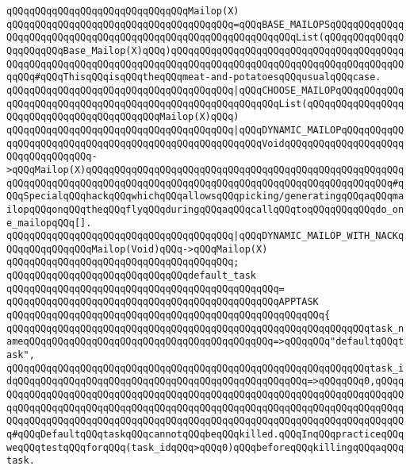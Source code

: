 \verb|qQQqqQQqqQQqqQQqqQQqqQQqqQQqqQQqMailop(X)|\newline
\verb|qQQqqQQqqQQqqQQqqQQqqQQqqQQqqQQqqQQqqQQq=qQQqBASE_MAILOPSqQQqqQQqqQQqqQQqqQQqqQQqqQQqqQQqqQQqqQQqqQQqqQQqqQQqqQQqqQQqqQQqList(qQQqqQQqqQQqqQQqqQQqqQQqBase_Mailop(X)qQQq)qQQqqQQqqQQqqQQqqQQqqQQqqQQqqQQqqQQqqQQqqQQqqQQqqQQqqQQqqQQqqQQqqQQqqQQqqQQqqQQqqQQqqQQqqQQqqQQqqQQqqQQqqQQqqQQqqQQq#qQQqThisqQQqisqQQqtheqQQqmeat-and-potatoesqQQqusualqQQqcase.|\newline
\verb|qQQqqQQqqQQqqQQqqQQqqQQqqQQqqQQqqQQqqQQq|\verb#|qQQqCHOOSE_MAILOPqQQqqQQqqQQqqQQqqQQqqQQqqQQqqQQqqQQqqQQqqQQqqQQqqQQqqQQqqQQqList(qQQqqQQqqQQqqQQqqQQqqQQqqQQqqQQqqQQqqQQqqQQqMailop(X)qQQq)#\newline
\verb|qQQqqQQqqQQqqQQqqQQqqQQqqQQqqQQqqQQqqQQq|\verb#|qQQqDYNAMIC_MAILOPqQQqqQQqqQQqqQQqqQQqqQQqqQQqqQQqqQQqqQQqqQQqqQQqqQQqqQQqVoidqQQqqQQqqQQqqQQqqQQqqQQqqQQqqQQqqQQq->qQQqMailop(X)qQQqqQQqqQQqqQQqqQQqqQQqqQQqqQQqqQQqqQQqqQQqqQQqqQQqqQQqqQQqqQQqqQQqqQQqqQQqqQQqqQQqqQQqqQQqqQQqqQQqqQQqqQQqqQQqqQQqqQQqqQQq#\verb|#qQQqSpecialqQQqhackqQQqwhichqQQqallowsqQQqpicking/generatingqQQqaqQQqmailopqQQqonqQQqtheqQQqflyqQQqduringqQQqaqQQqcallqQQqtoqQQqqQQqqQQqdo_one_mailopqQQq[].|\newline
\verb|qQQqqQQqqQQqqQQqqQQqqQQqqQQqqQQqqQQqqQQq|\verb#|qQQqDYNAMIC_MAILOP_WITH_NACKqQQqqQQqqQQqqQQqMailop(Void)qQQq->qQQqMailop(X)#\newline
\verb|qQQqqQQqqQQqqQQqqQQqqQQqqQQqqQQqqQQqqQQq;|\newline
\newline
\verb|qQQqqQQqqQQqqQQqqQQqqQQqqQQqqQQqdefault_task|\newline
\verb|qQQqqQQqqQQqqQQqqQQqqQQqqQQqqQQqqQQqqQQqqQQqqQQq=|\newline
\verb|qQQqqQQqqQQqqQQqqQQqqQQqqQQqqQQqqQQqqQQqqQQqqQQqAPPTASK|\newline
\verb|qQQqqQQqqQQqqQQqqQQqqQQqqQQqqQQqqQQqqQQqqQQqqQQqqQQqqQQq{|\newline
\verb|qQQqqQQqqQQqqQQqqQQqqQQqqQQqqQQqqQQqqQQqqQQqqQQqqQQqqQQqqQQqqQQqtask_nameqQQqqQQqqQQqqQQqqQQqqQQqqQQqqQQqqQQqqQQqqQQq=>qQQqqQQq"defaultqQQqtask",|\newline
\verb|qQQqqQQqqQQqqQQqqQQqqQQqqQQqqQQqqQQqqQQqqQQqqQQqqQQqqQQqqQQqqQQqtask_idqQQqqQQqqQQqqQQqqQQqqQQqqQQqqQQqqQQqqQQqqQQqqQQqqQQq=>qQQqqQQq0,qQQqqQQqqQQqqQQqqQQqqQQqqQQqqQQqqQQqqQQqqQQqqQQqqQQqqQQqqQQqqQQqqQQqqQQqqQQqqQQqqQQqqQQqqQQqqQQqqQQqqQQqqQQqqQQqqQQqqQQqqQQqqQQqqQQqqQQqqQQqqQQqqQQqqQQqqQQqqQQqqQQqqQQqqQQqqQQqqQQqqQQqqQQqqQQqqQQqqQQqqQQqqQQqqQQqqQQq#qQQqDefaultqQQqtaskqQQqcannotqQQqbeqQQqkilled.qQQqInqQQqpracticeqQQqweqQQqtestqQQqforqQQq(task_idqQQq>qQQq0)qQQqbeforeqQQqkillingqQQqaqQQqtask.|\newline
